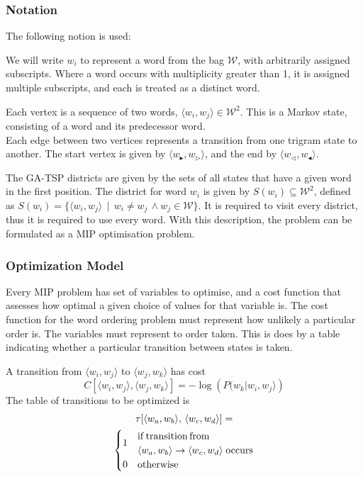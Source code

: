 \documentclass[twocolumn]{article}
\begin{document}
\renewcommand{\s}{w_{\blacktriangleright}}
\renewcommand{\ss}{w_{\triangleright}}
\newcommand{\e}{w_{\triangleleft}}
\newcommand{\ee}{w_{\blacktriangleleft}}
\newcommand{\W}{\mathcal{W}}


\subsubsection{Notation}

The following notion is used:

We will write $w_{i}$ to represent a word from the bag \textbf{$\W$}, with
arbitrarily assigned subscripts. Where a word occurs with multiplicity
greater than 1, it is assigned multiple subscripts, and each is treated
as a distinct word.

Each vertex is a sequence of two words, $\langle w_{i},w_{j}\rangle\in\W^{2}$.
This is a Markov state, consisting of a word and its predecessor word. \\
Each edge between two vertices represents a transition from one trigram state to another.
The start vertex is given by $\langle\s,\ss\rangle$, and the end by $\langle\e,\ee\rangle$.

The GA-TSP districts are given by the sets of all states that have
a given word in the first position. The district for word $w_{i}$
is given by $S(w_{i})\subseteq\W^{2}$, defined as $S(w_{i})=\{\langle w_{i},w_{j}\rangle\,\mid\,w_{i}\ne w_{j}\,\wedge w_{j}\in\W\}$. It is required to visit every district, thus it is required to use every word.
With this description, the problem can be formulated as a MIP optimisation problem.


\subsubsection{Optimization Model}
Every MIP problem has set of variables to optimise, and a cost function that assesses how optimal a given choice of values for that variable is. The cost function for the word ordering problem must represent how unlikely a particular order is. The variables must represent to order taken. This is does by a table indicating whether a particular transition between states is taken.

A transition from $\langle w_{i},w_{j}\rangle$ to $\langle w_{j},w_{k}\rangle$
 has cost $$C[\langle w_{i},w_{j}\rangle,\langle w_{j},w_{k}\rangle]=-\log\left(P(w_{k}|w_{i},w_{j}\rangle\right)$$ 
The table of transitions to be optimized is
\begin{multline*}
 \tau[\langle w_{a},w_{b}\rangle,\,\langle w_{c},w_{d}\rangle] = \\
 \begin{cases}
	 \multirow{2}{*}{1} & \mathrm{if\,transition\,from} \\
	 	                & \langle w_{a},w_{b}\rangle \to \langle w_{c},w_{d}\rangle
	 	                   \;\mathrm{ occurs} \\
                     0  & \mathrm{otherwise}
  \end{cases}
\end{multline*}
\end{document}
